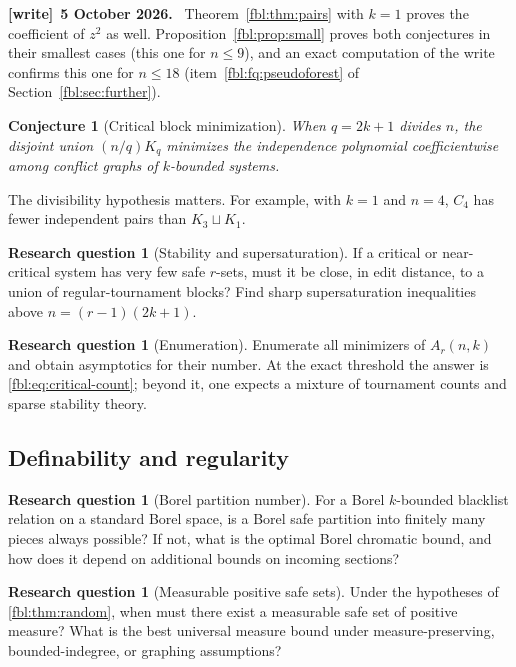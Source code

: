 \documentclass[11pt]{article}
\newtheorem{conjecture}[theorem]{Conjecture}
\theoremstyle{definition}
\newtheorem{question}[theorem]{Research question}
\theoremstyle{remark}
\newenvironment{writenote}[1][]{\par\smallskip\begingroup\small
 \noindent\textbf{[write]}\if\relax\detokenize{#1}\relax\else~\textbf{#1.}\fi\ }%
 {\par\endgroup\smallskip}
\begin{document}
\begin{writenote}[5 October 2026]
Theorem~\ref{fbl:thm:pairs} with $k=1$ proves the coefficient of $z^2$ as
well. Proposition~\ref{fbl:prop:small} proves both conjectures in their
smallest cases (this one for $n\le9$), and an exact computation of the write
confirms this one for $n\le18$ (item~\ref{fbl:fq:pseudoforest} of
Section~\ref{fbl:sec:further}).
\end{writenote}

\begin{conjecture}[Critical block minimization]\label{fbl:conj:critical-block}
When $q=2k+1$ divides $n$, the disjoint union $(n/q)K_q$ minimizes the
independence polynomial coefficientwise among conflict graphs of
$k$-bounded systems.
\end{conjecture}

The divisibility hypothesis matters.  For example, with $k=1$ and $n=4$,
$C_4$ has fewer independent pairs than $K_3\sqcup K_1$.

\begin{question}[Stability and supersaturation]\label{fbl:q:stability}
If a critical or near-critical system has very few safe $r$-sets, must it be
close, in edit distance, to a union of regular-tournament blocks?  Find sharp
supersaturation inequalities above $n=(r-1)(2k+1)$.
\end{question}

\begin{question}[Enumeration]\label{fbl:q:enumeration}
Enumerate all minimizers of $A_r(n,k)$ and obtain asymptotics for their
number.  At the exact threshold the answer is
\cref{fbl:eq:critical-count}; beyond it, one expects a mixture of tournament
counts and sparse stability theory.
\end{question}

\subsection{Definability and regularity}

\begin{question}[Borel partition number]\label{fbl:q:borel}
For a Borel $k$-bounded blacklist relation on a standard Borel space, is a
Borel safe partition into finitely many pieces always possible?  If not,
what is the optimal Borel chromatic bound, and how does it depend on
additional bounds on incoming sections?
\end{question}

\begin{question}[Measurable positive safe sets]\label{fbl:q:measurable}
Under the hypotheses of \cref{fbl:thm:random}, when must there exist a measurable
safe set of positive measure?  What is the best universal measure bound
under measure-preserving, bounded-indegree, or graphing assumptions?
\end{question}
\end{document}
